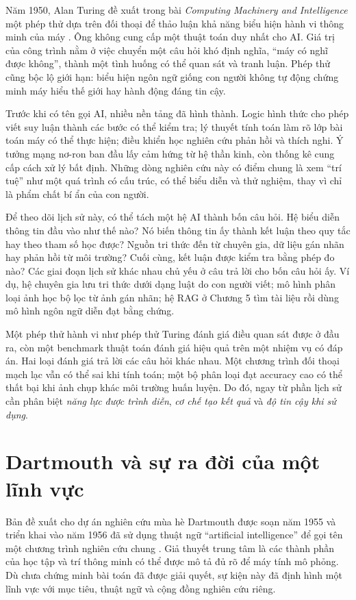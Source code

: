 \documentclass[12pt,a4paper]{report}
\begin{document}
Năm 1950, Alan Turing đề xuất trong bài \textit{Computing Machinery and Intelligence} một phép thử dựa trên đối thoại để thảo luận khả năng biểu hiện hành vi thông minh của máy \cite{turing1950}. Ông không cung cấp một thuật toán duy nhất cho AI. Giá trị của công trình nằm ở việc chuyển một câu hỏi khó định nghĩa, ``máy có nghĩ được không'', thành một tình huống có thể quan sát và tranh luận. Phép thử cũng bộc lộ giới hạn: biểu hiện ngôn ngữ giống con người không tự động chứng minh máy hiểu thế giới hay hành động đáng tin cậy.

Trước khi có tên gọi AI, nhiều nền tảng đã hình thành. Logic hình thức cho phép viết suy luận thành các bước có thể kiểm tra; lý thuyết tính toán làm rõ lớp bài toán máy có thể thực hiện; điều khiển học nghiên cứu phản hồi và thích nghi. Ý tưởng mạng nơ-ron ban đầu lấy cảm hứng từ hệ thần kinh, còn thống kê cung cấp cách xử lý bất định. Những dòng nghiên cứu này có điểm chung là xem ``trí tuệ'' như một quá trình có cấu trúc, có thể biểu diễn và thử nghiệm, thay vì chỉ là phẩm chất bí ẩn của con người.

Để theo dõi lịch sử này, có thể tách một hệ AI thành bốn câu hỏi. Hệ biểu diễn thông tin đầu vào như thế nào? Nó biến thông tin ấy thành kết luận theo quy tắc hay theo tham số học được? Nguồn tri thức đến từ chuyên gia, dữ liệu gán nhãn hay phản hồi từ môi trường? Cuối cùng, kết luận được kiểm tra bằng phép đo nào? Các giai đoạn lịch sử khác nhau chủ yếu ở câu trả lời cho bốn câu hỏi ấy. Ví dụ, hệ chuyên gia lưu tri thức dưới dạng luật do con người viết; mô hình phân loại ảnh học bộ lọc từ ảnh gán nhãn; hệ RAG ở Chương 5 tìm tài liệu rồi dùng mô hình ngôn ngữ diễn đạt bằng chứng.

Một phép thử hành vi như phép thử Turing đánh giá điều quan sát được ở đầu ra, còn một benchmark thuật toán đánh giá hiệu quả trên một nhiệm vụ có đáp án. Hai loại đánh giá trả lời các câu hỏi khác nhau. Một chương trình đối thoại mạch lạc vẫn có thể sai khi tính toán; một bộ phân loại đạt accuracy cao có thể thất bại khi ảnh chụp khác môi trường huấn luyện. Do đó, ngay từ phần lịch sử cần phân biệt \emph{năng lực được trình diễn}, \emph{cơ chế tạo kết quả} và \emph{độ tin cậy khi sử dụng}.

\section{Dartmouth và sự ra đời của một lĩnh vực}
Bản đề xuất cho dự án nghiên cứu mùa hè Dartmouth được soạn năm 1955 và triển khai vào năm 1956 đã sử dụng thuật ngữ ``artificial intelligence'' để gọi tên một chương trình nghiên cứu chung \cite{dartmouth1955}. Giả thuyết trung tâm là các thành phần của học tập và trí thông minh có thể được mô tả đủ rõ để máy tính mô phỏng. Dù chưa chứng minh bài toán đã được giải quyết, sự kiện này đã định hình một lĩnh vực với mục tiêu, thuật ngữ và cộng đồng nghiên cứu riêng.
\end{document}
